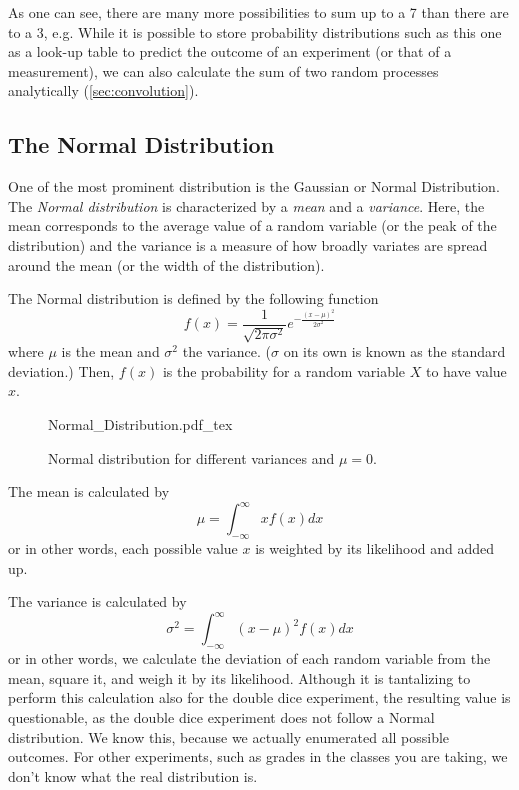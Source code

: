 As one can see, there are many more possibilities to sum up to a 7 than there are to a 3, e.g. While it is possible to store probability distributions such as this one as a look-up table to predict the outcome of an experiment (or that of a measurement), we can also calculate the sum of two random processes analytically (\cref{sec:convolution}).


\subsection{The Normal Distribution}
One of the most prominent distribution is the Gaussian or Normal Distribution. The \textsl{Normal distribution} is characterized by a \textsl{mean} and a \textsl{variance}. Here, the mean corresponds to the average value of a random variable (or the peak of the distribution) and the variance is a measure of how broadly variates are spread around the mean (or the width of the distribution).

The Normal distribution is defined by the following function
 \begin{equation}
f(x)=\frac{1}{\sqrt{2\pi\sigma^2}}e^{-\frac{(x-\mu)^2}{2\sigma^2}}
\end{equation}
where $ \mu$ is the mean and $ \sigma^2$ the variance. ($ \sigma$ on its own is known as the standard deviation.) Then, $ f(x)$ is the probability for a random variable $ X$ to have value $ x$.

\begin{figure}
	\centering
    \def\svgwidth{\textwidth}
    {Normal_Distribution.pdf_tex}
	\caption{Normal distribution for different variances and $\mu=0$.
    }
	\label{fig:Normal_Distribution_PDF}
\end{figure}

The mean is calculated by
\begin{equation}
\mu=\int_{-\infty}^{\infty}xf(x)dx
\end{equation}
or in other words, each possible value $ x$ is weighted by its likelihood and added up.

The variance is calculated by
\begin{equation}
\sigma^2=\int_{-\infty}^{\infty}(x-\mu)^2f(x)dx
\end{equation}
or in other words, we calculate the deviation of each random variable from the mean, square it, and weigh it by its likelihood. Although it is tantalizing to perform this calculation also for the double dice experiment, the resulting value is questionable, as the double dice experiment does not follow a Normal distribution. We know this, because we actually enumerated all possible outcomes. For other experiments, such as grades in the classes you are taking, we don't know what the real distribution is.



